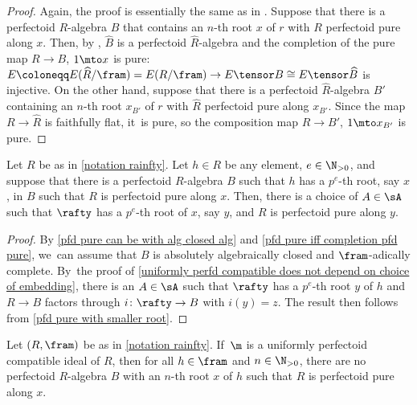 \begin{proof}
Again, the proof is essentially the same as in \cite[Lem.\,4.8]{BMPSTWWPerfectoidPure}. Suppose that there is a perfectoid $R$\nobreakdash-algebra $B$ that contains an $n$-th root $x$ of $r$ with $R$ perfectoid pure along $x$. Then, by \cite[Prop.\,2.1.11\,(e)]{CesnaviciusScholzePurityFlatCohomology}, $\widehat{B}$ is a perfectoid $\widehat{R}$-algebra and the completion of the pure map $R\to B$, $1\mto x$ is pure: $E\coloneqq E(\widehat{R}/\fram)=E(R/\fram)\to E\tensor B \cong E\tensor \widehat{B}$ is injective. On the other hand, suppose that there is a perfectoid $\widehat{R}$-algebra $B'$ containing an $n$-th root $x_{B'}$ of $r$ with $\widehat{R}$ perfectoid pure along $x_{B'}$. Since the map $R\to \widehat{R}$ is faithfully flat, it~is pure, so the composition map $R\to B'$, $1\mto x_{B'}$ is pure.
\end{proof}

\begin{proposition}\label{pfd pure can take smaller algebra}
Let $R$ be as in \autoref{notation rainfty}. Let $h\in R$ be any element, $e\in \N_{>0}$, and suppose that there is a perfectoid $R$\nobreakdash-algebra $B$ such that $h$ has a $p^e$-th root, say $x$, in $B$ such that $R$ is perfectoid pure along $x$. Then, there is a choice of $A\in \sA$ such that $\rafty$ has a $p^e$-th root of $x$, say $y$, and $R$ is perfectoid pure along $y$.
\end{proposition}

\begin{proof}
By \autoref{pfd pure can be with alg closed alg} and \autoref{pfd pure iff completion pfd pure}, we~can assume that $B$ is absolutely algebraically closed and $\fram$-adically complete. By~the proof of \autoref{uniformly perfd compatible does not depend on choice of embedding}, there is an $A\in \sA$ such that $\rafty$ has a $p^e$-th root $y$ of $h$ and
$R\to B$ factors through $i\colon \rafty\to B$ with $i(y)=z$. The result then follows from \autoref{pfd pure with smaller root}.
\end{proof}

\begin{proposition}\label{max ideal unif compatible implies not pfd pure}
Let $(R,\fram)$ be as in \autoref{notation rainfty}. If~$\m$ is a uniformly perfectoid compatible ideal of $R$, then for all $h\in \fram$ and $n\in \N_{> 0}$, there are no perfectoid $R$\nobreakdash-algebra $B$ with an $n$-th root $x$ of $h$ such that $R$ is perfectoid pure along $x$.
\end{proposition}

